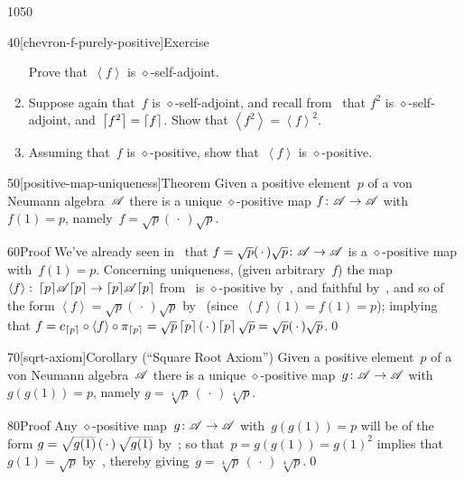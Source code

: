 \begin{parsec}{1050}
\begin{point}{40}[chevron-f-purely-positive]{Exercise}
\begin{enumerate}
Prove that~$\left<f\right>$
is $\diamond$-self-adjoint.
\item
Suppose again that~$f$ is $\diamond$-self-adjoint,
and recall from~ that $f^2$
is $\diamond$-self-adjoint, and~$\left\lceil f^2\right\rceil = \left\lceil f\right\rceil$.
Show that $\left<f^2\right> = \left<f\right>^2$.
\item
Assuming that~$f$ is $\diamond$-positive,
show that~$\left<f\right>$ is $\diamond$-positive.
\end{enumerate}
\spacingfix
\end{point}%
\begin{point}{50}[positive-map-uniqueness]{Theorem}%
Given a positive element~$p$ of a von Neumann algebra~$\mathscr{A}$
there is a unique $\diamond$-positive map $f\colon \mathscr{A}\to\mathscr{A}$
with~$f(1)=p$,
namely~$f=\sqrt{p}(\,\cdot\,)\sqrt{p}$.
\begin{point}{60}{Proof}%
We've already seen in~
that $f=\sqrt{p}(\,\cdot\,)\sqrt{p}\colon \mathscr{A}\to\mathscr{A}$
is a $\diamond$-positive map with~$f(1)=p$.
Concerning uniqueness,
(given arbitrary~$f$)
the map~$\left<f\right>\colon \left\lceil p\right\rceil\!\mathscr{A}\!\left\lceil p\right\rceil
\to \left\lceil p\right\rceil\!\mathscr{A}\!\left\lceil p\right\rceil$
from~
is $\diamond$-positive by~,
and faithful by~,
and so of the form
$\left<f\right>=\sqrt{p}(\,\cdot\,)\sqrt{p}$
by~
(since~$\left<f\right>\!(1)=f(1)=p$);
implying that
$f= c_{\left\lceil p\right\rceil}\circ\left<f\right>\circ \pi_{\left\lceil p\right\rceil}
= \sqrt{p}\left\lceil p\right\rceil(\,\cdot\,)\left\lceil p\right\rceil\sqrt{p}
= \sqrt{p}(\,\cdot\,)\sqrt{p}$.\qed
\end{point}
\end{point}
\begin{point}{70}[sqrt-axiom]{Corollary (``Square Root Axiom'')}%
Given a positive element~$p$ of a von Neumann algebra~$\mathscr{A}$
there is a unique $\diamond$-positive map~$g\colon \mathscr{A}\to\mathscr{A}$
with~$g(g(1))=p$, namely
$g=\sqrt[4]{p}\,(\,\cdot\,)\,\sqrt[4]{p}$.
\begin{point}{80}{Proof}%
Any $\diamond$-positive map~$g\colon \mathscr{A}\to\mathscr{A}$ with~$g(g(1))=p$
will be of the form
$g=\smash{\sqrt{g(1)}\,(\,\cdot\,)\,\sqrt{g(1)}}$
by~;
so that~$p=g(g(1))=g(1)^2$
implies that~$g(1)=\sqrt{p}$
by~,
thereby giving~$g=\sqrt[4]{p}\,(\,\cdot\,)\,\sqrt[4]{p}$.\qed
\end{point}
\end{point}
\end{parsec}
